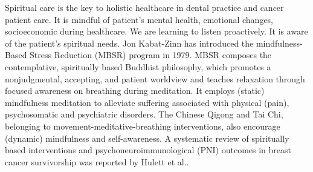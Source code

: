 \documentclass[12pt, a4paper]{article}
\begin{document}
Spiritual care is the key to holistic healthcare in dental practice\cite{Ling-ChengMong2021} and cancer patient care\cite{Hulett2016}. 
It is mindful of patient's mental health, emotional changes, socioeconomic during healthcare.  %
We are learning to listen proactively.
It is aware of the patient's spiritual needs.
Jon Kabat-Zinn has introduced the mindfulness-Based Stress Reduction (MBSR) program in 1979\cite{Niazi2011}. MBSR composes the contemplative, spiritually based Buddhist philosophy, which promotes a nonjudgmental, accepting, and patient worldview and teaches relaxation through focused awareness on breathing during meditation. It employs (static) mindfulness meditation to alleviate suffering associated with physical (pain), psychosomatic and psychiatric disorders.
The Chinese Qigong and Tai Chi, belonging to movement-meditative-breathing interventions, also encourage (dynamic) mindfulness and self-awareness. 
A systematic review of spiritually based interventions and psychoneuroimmunological (PNI) outcomes in breast cancer survivorship was reported by Hulett et al.\cite{Hulett2016}. 
\end{document}
